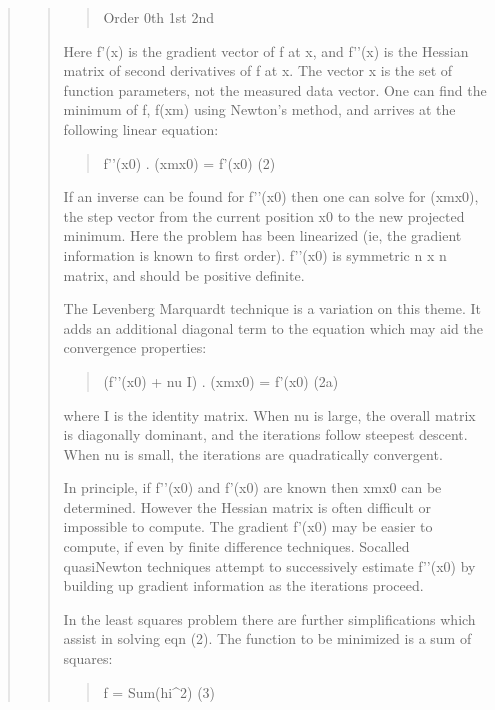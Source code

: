 \documentclass[letterpaper,10pt,english]{sphinxmanual}
\begin{document}
\begin{quote}
\begin{quote}
\begin{quote}
Order  0th               1st                                     2nd
\end{quote}

Here f’(x) is the gradient vector of f at x, and f’’(x) is the
Hessian matrix of second derivatives of f at x.  The vector x is
the set of function parameters, not the measured data vector.  One
can find the minimum of f, f(xm) using Newton’s method, and
arrives at the following linear equation:
\begin{quote}

f’’(x0) . (xm\sphinxhyphen{}x0) = \sphinxhyphen{} f’(x0)                                                  (2)
\end{quote}

If an inverse can be found for f’’(x0) then one can solve for
(xm\sphinxhyphen{}x0), the step vector from the current position x0 to the new
projected minimum.  Here the problem has been linearized (ie, the
gradient information is known to first order).  f’’(x0) is
symmetric n x n matrix, and should be positive definite.

The Levenberg \sphinxhyphen{} Marquardt technique is a variation on this theme.
It adds an additional diagonal term to the equation which may aid the
convergence properties:
\begin{quote}

(f’’(x0) + nu I) . (xm\sphinxhyphen{}x0) = \sphinxhyphen{}f’(x0)                            (2a)
\end{quote}

where I is the identity matrix.  When nu is large, the overall
matrix is diagonally dominant, and the iterations follow steepest
descent.  When nu is small, the iterations are quadratically
convergent.

In principle, if f’’(x0) and f’(x0) are known then xm\sphinxhyphen{}x0 can be
determined.  However the Hessian matrix is often difficult or
impossible to compute.  The gradient f’(x0) may be easier to
compute, if even by finite difference techniques.  So\sphinxhyphen{}called
quasi\sphinxhyphen{}Newton techniques attempt to successively estimate f’’(x0)
by building up gradient information as the iterations proceed.

In the least squares problem there are further simplifications
which assist in solving eqn (2).  The function to be minimized is
a sum of squares:
\begin{quote}

f = Sum(hi\textasciicircum{}2)                                                                                 (3)
\end{quote}


\end{quote}
\end{quote}
\end{document}
